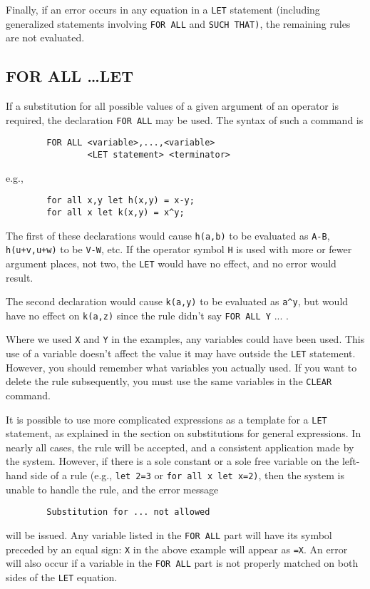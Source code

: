 \documentclass[11pt,letterpaper]{book}
\makeatletter
\newcommand{\underscore}{\_}
\newcommand{\ttindex}[1]{{\renewcommand{\_}{\protect\underscore}%
                          \index{#1@{\tt #1}}}}
\makeatother
\begin{document}
Finally, if an error occurs in any equation in a {\tt LET} statement
(including generalized statements involving {\tt FOR ALL} and {\tt SUCH
THAT)}, the remaining rules are not evaluated.

\subsection{FOR ALL \ldots LET}\ttindex{FOR ALL}
If a substitution for all possible values of a given argument of an
operator is required, the declaration {\tt FOR ALL} may be used. The
syntax of such a command is
{\small\begin{verbatim}
        FOR ALL <variable>,...,<variable>
                <LET statement> <terminator>
\end{verbatim}}
e.g.,
{\small\begin{verbatim}
        for all x,y let h(x,y) = x-y;
        for all x let k(x,y) = x^y;
\end{verbatim}}
The first of these declarations would cause {\tt h(a,b)} to be evaluated
as {\tt A-B}, {\tt h(u+v,u+w)} to be {\tt V-W}, etc.  If the operator
symbol {\tt H} is used with more or fewer argument places, not two, the
{\tt LET} would have no effect, and no error would result.

The second declaration would cause {\tt k(a,y)} to be evaluated as
{\tt a\verb|^|y}, but would have no effect on {\tt k(a,z)} since the rule
didn't say {\tt FOR ALL Y} ... .

Where we used {\tt X} and {\tt Y} in the examples, any variables could
have been used.  This use of a variable doesn't affect the value it may
have outside the {\tt LET} statement.  However, you should remember what
variables you actually used.  If you want to delete the rule subsequently,
you must use the same variables in the {\tt CLEAR} command.

It is possible to use more complicated expressions as a template for a
{\tt LET} statement, as explained in the section on substitutions for
general expressions.  In nearly all cases, the rule will be accepted, and
a consistent application made by the system.  However, if there is a sole
constant or a sole free variable on the left-hand side of a rule (e.g.,
{\tt let 2=3} or {\tt for all x let x=2)}, then the system is unable to
handle the rule, and the error message
{\small\begin{verbatim}
        Substitution for ... not allowed
\end{verbatim}}
will be issued.  Any variable listed in the {\tt FOR ALL} part will have
its symbol preceded by an equal sign: {\tt X} in the above example will
appear as {\tt =X}.  An error will also occur if a variable in the
{\tt FOR ALL} part is not properly matched on both sides of the {\tt LET}
equation.
\end{document}
